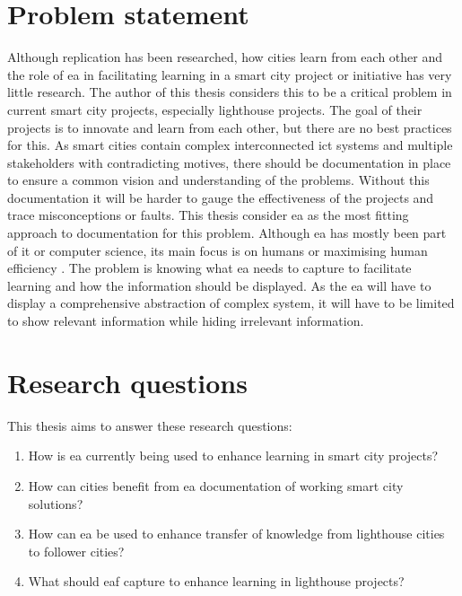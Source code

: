\section{Problem statement}
Although replication has been researched, how cities learn from each other and the role of \gls{ea} in facilitating learning in a smart city project or initiative has very little research. The author of this thesis considers this to be a critical problem in current smart city projects, especially lighthouse projects. The goal of their projects is to innovate and learn from each other, but there are no best practices for this. As smart cities contain complex interconnected \gls{ict} systems and multiple stakeholders with contradicting motives, there should be documentation in place to ensure a common vision and understanding of the problems. Without this documentation it will be harder to gauge the effectiveness of the projects and trace misconceptions or faults. This thesis consider \gls{ea} as the most fitting approach to documentation for this problem. Although \gls{ea} has mostly been part of \gls{it} or computer science, its main focus is on humans or maximising human efficiency \cite{cameron2013analyzing}. The problem is knowing what \gls{ea} needs to capture to facilitate learning and how the information should be displayed. As the \gls{ea} will have to display a comprehensive abstraction of complex system, it will have to be limited to show relevant information while hiding irrelevant information. 

\section{Research questions} %

This thesis aims to answer these research questions:
\begin{enumerate}[label=\textbf{RQ\arabic*:}, wide=1em, leftmargin=4em, labelsep=*]
    \item How is \gls{ea} currently being used to enhance learning in smart city projects?
    \item How can cities benefit from \gls{ea} documentation of working smart city solutions?
    \item How can \gls{ea} be used to enhance transfer of knowledge from lighthouse cities to follower cities?
    \item What should \gls{eaf} capture to enhance learning in lighthouse projects?
\end{enumerate}


